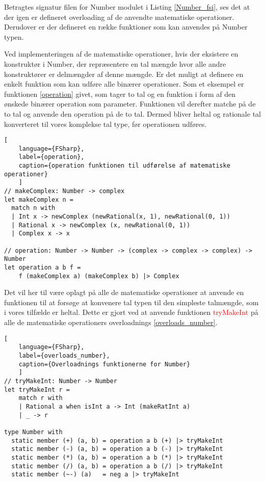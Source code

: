 Betragtes signatur filen for Number modulet i Listing \ref{Number_fsi}, ses det at der igen er defineret overloading af de anvendte matematiske operationer. Derudover er der defineret en række funktioner som kan anvendes på Number typen. 



Ved implementeringen af de matematiske operationer, hvis der eksistere en konstruktør i Number, der repræsentere en tal mængde hvor alle andre konstruktører er delmængder af denne mængde. Er det muligt at definere en enkelt funktion som kan udføre alle binærer operationer. Som et eksempel er funktionen \ref{operation} givet, som tager to tal og en funktion i form af den ønskede binærer operation som parameter. Funktionen vil derefter matche på de to tal og anvende den operation på de to tal. Dermed bliver heltal og rationale tal konverteret til vores komplekse tal type, før operationen udføres.

\begin{lstlisting}[
    language={FSharp},
    label={operation}, 
    caption={operation funktionen til udførelse af matematiske operationer}
    ]
// makeComplex: Number -> complex
let makeComplex n =
  match n with
  | Int x -> newComplex (newRational(x, 1), newRational(0, 1))
  | Rational x -> newComplex (x, newRational(0, 1))
  | Complex x -> x

// operation: Number -> Number -> (complex -> complex -> complex) -> Number
let operation a b f =
    f (makeComplex a) (makeComplex b) |> Complex

\end{lstlisting}

Det vil her til være oplagt på alle de matematiske operationer at anvende en funktionen til at forsøge at konvenere tal typen til den simpleste talmængde, som i vores tilfælde er heltal. Dette er gjort ved at anvende funktionen \textcolor{red}{tryMakeInt} på alle de matematiske operationers overloadnings \ref{overloads_number}. 

\begin{lstlisting}[
    language={FSharp},
    label={overloads_number}, 
    caption={Overloadnings funktionerne for Number}
    ]
// tryMakeInt: Number -> Number
let tryMakeInt r =
    match r with
    | Rational a when isInt a -> Int (makeRatInt a)
    | _ -> r
    
type Number with
  static member (+) (a, b) = operation a b (+) |> tryMakeInt
  static member (-) (a, b) = operation a b (-) |> tryMakeInt
  static member (*) (a, b) = operation a b (*) |> tryMakeInt
  static member (/) (a, b) = operation a b (/) |> tryMakeInt
  static member (~-) (a)   = neg a |> tryMakeInt
\end{lstlisting}


